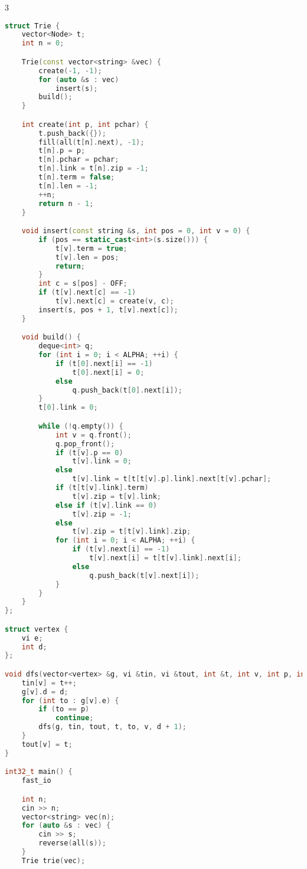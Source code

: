 \documentclass[10pt,a4paper,landscape,twosided]{extarticle}
\begin{document}
\begin{multicols}{3}
\begin{lstlisting}[language=C++]
struct Trie {
    vector<Node> t;
    int n = 0;

    Trie(const vector<string> &vec) {
        create(-1, -1);
        for (auto &s : vec)
            insert(s);
        build();
    }

    int create(int p, int pchar) {
        t.push_back({});
        fill(all(t[n].next), -1);
        t[n].p = p;
        t[n].pchar = pchar;
        t[n].link = t[n].zip = -1;
        t[n].term = false;
        t[n].len = -1;
        ++n;
        return n - 1;
    }

    void insert(const string &s, int pos = 0, int v = 0) {
        if (pos == static_cast<int>(s.size())) {
            t[v].term = true;
            t[v].len = pos;
            return;
        }
        int c = s[pos] - OFF;
        if (t[v].next[c] == -1)
            t[v].next[c] = create(v, c);
        insert(s, pos + 1, t[v].next[c]);
    }

    void build() {
        deque<int> q;
        for (int i = 0; i < ALPHA; ++i) {
            if (t[0].next[i] == -1)
                t[0].next[i] = 0;
            else
                q.push_back(t[0].next[i]);
        }
        t[0].link = 0;

        while (!q.empty()) {
            int v = q.front();
            q.pop_front();
            if (t[v].p == 0)
                t[v].link = 0;
            else
                t[v].link = t[t[t[v].p].link].next[t[v].pchar];
            if (t[t[v].link].term)
                t[v].zip = t[v].link;
            else if (t[v].link == 0)
                t[v].zip = -1;
            else
                t[v].zip = t[t[v].link].zip;
            for (int i = 0; i < ALPHA; ++i) {
                if (t[v].next[i] == -1)
                    t[v].next[i] = t[t[v].link].next[i];
                else
                    q.push_back(t[v].next[i]);
            }
        }
    }
};

struct vertex {
    vi e;
    int d;
};

void dfs(vector<vertex> &g, vi &tin, vi &tout, int &t, int v, int p, int d) {
    tin[v] = t++;
    g[v].d = d;
    for (int to : g[v].e) {
        if (to == p)
            continue;
        dfs(g, tin, tout, t, to, v, d + 1);
    }
    tout[v] = t;
}

int32_t main() {
    fast_io

    int n;
    cin >> n;
    vector<string> vec(n);
    for (auto &s : vec) {
        cin >> s;
        reverse(all(s));
    }
    Trie trie(vec);


\end{lstlisting}
\end{multicols}
\end{document}
